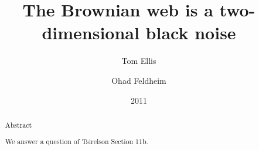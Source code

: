 {
\title{The Brownian web is a two-dimensional black noise}

\author{Tom Ellis\\%
\and Ohad Feldheim}

\date{2011}

\maketitle

\begin{abstract}
Abstract

We answer a question of
Tsirelson \cite{tsirelson-nonclassical-stochastic-flows} Section 11b.
\end{abstract}

}
